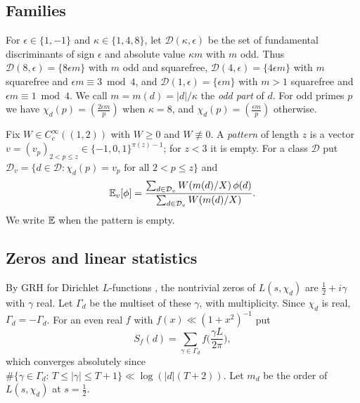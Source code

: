 \documentclass[11pt,colorlinks]{charlie}
\newcommand{\cD}{\mathcal{D}}
\begin{document}
\subsection{Families}
For $\epsilon\in\{1,-1\}$ and $\kappa\in\{1,4,8\}$, let $\cD(\kappa,\epsilon)$ be the set of fundamental discriminants of sign $\epsilon$ and absolute value $\kappa m$ with $m$ odd. Thus $\cD(8,\epsilon)=\{8\epsilon m\}$ with $m$ odd and squarefree, $\cD(4,\epsilon)=\{4\epsilon m\}$ with $m$ squarefree and $\epsilon m\equiv3\bmod4$, and $\cD(1,\epsilon)=\{\epsilon m\}$ with $m>1$ squarefree and $\epsilon m\equiv1\bmod4$. We call $m=m(d)=|d|/\kappa$ the \emph{odd part} of $d$. For odd primes $p$ we have $\chi_d(p)=(\tfrac{2\epsilon m}{p})$ when $\kappa=8$, and $\chi_d(p)=(\tfrac{\epsilon m}{p})$ otherwise.

Fix $W\in C_c^\infty((1,2))$ with $W\ge0$ and $W\not\equiv0$. A \emph{pattern} of length $z$ is a vector $v=(v_p)_{2<p\le z}\in\{-1,0,1\}^{\pi(z)-1}$; for $z<3$ it is empty. For a class $\cD$ put $\cD_v=\{d\in\cD:\chi_d(p)=v_p\text{ for all }2<p\le z\}$ and
\[
 \E_v[\phi]=\frac{\sum_{d\in\cD_v}W(m(d)/X)\,\phi(d)}{\sum_{d\in\cD_v}W(m(d)/X)} .
\]
We write $\mathbb{E}$ when the pattern is empty.

\subsection{Zeros and linear statistics}\label{ssec:zeros}
By GRH for Dirichlet $L$-functions \cite{Alpoge}, the nontrivial zeros of $L(s,\chi_d)$ are $\tfrac12+i\gamma$ with $\gamma$ real. Let $\Gamma_d$ be the multiset of these $\gamma$, with multiplicity. Since $\chi_d$ is real, $\Gamma_d=-\Gamma_d$. For an even real $f$ with $f(x)\ll(1+x^2)^{-1}$ put
\[
 S_f(d)=\sum_{\gamma\in\Gamma_d}f\Big(\frac{\gamma L}{2\pi}\Big),
\]
which converges absolutely since $\#\{\gamma\in\Gamma_d:\,T\le|\gamma|\le T+1\}\ll\log(|d|(T+2))$. Let $m_d$ be the order of $L(s,\chi_d)$ at $s=\tfrac12$.
\end{document}

